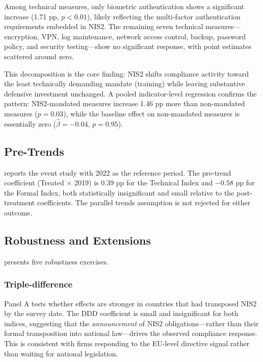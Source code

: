 \documentclass[12pt]{article}
\begin{document}
Among technical measures, only biometric authentication shows a significant increase (1.71 pp, $p < 0.01$), likely reflecting the multi-factor authentication requirements embedded in NIS2. The remaining seven technical measures---encryption, VPN, log maintenance, network access control, backup, password policy, and security testing---show no significant response, with point estimates scattered around zero.

This decomposition is the core finding: NIS2 shifts compliance activity toward the least technically demanding mandate (training) while leaving substantive defensive investment unchanged. A pooled indicator-level regression confirms the pattern: NIS2-mandated measures increase 1.46 pp more than non-mandated measures ($p = 0.03$), while the baseline effect on non-mandated measures is essentially zero ($\hat{\beta} = -0.04$, $p = 0.95$).

\subsection{Pre-Trends}



 reports the event study with 2022 as the reference period. The pre-trend coefficient (Treated $\times$ 2019) is 0.39 pp for the Technical Index and $-0.58$ pp for the Formal Index, both statistically insignificant and small relative to the post-treatment coefficients. The parallel trends assumption is not rejected for either outcome.

\subsection{Robustness and Extensions}



 presents five robustness exercises.

\subsubsection*{Triple-difference} Panel A tests whether effects are stronger in countries that had transposed NIS2 by the survey date. The DDD coefficient is small and insignificant for both indices, suggesting that the \textit{announcement} of NIS2 obligations---rather than their formal transposition into national law---drives the observed compliance response. This is consistent with firms responding to the EU-level directive signal rather than waiting for national legislation.
\end{document}
